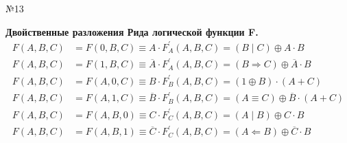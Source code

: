 \documentclass[]{article}
\begin{document}
	\begin{center}\begin{large}{№13}\end{large}\end{center}
	\textbf{Двойственные разложения Рида логической функции F.}
	\[
	\begin{aligned}
	F(A, B, C) &= F(0, B, C)\equiv A \cdot F^{'}_A(A,B,C)=(B\mid C)\oplus A \cdot B\\
	F(A, B, C) &= F(1, B, C)\equiv \overline{A} \cdot F^{'}_A(A,B,C)=(B\Rightarrow C)\oplus \overline{A}\cdot B\\
	F(A, B, C) &= F(A, 0, C)\equiv B\cdot F^{'}_B(A,B,C)=(1\oplus B)\cdot(A+C)\\
	F(A, B, C) &= F(A, 1, C)\equiv \overline{B} \cdot F^{'}_B(A,B,C)=(A\equiv C)\oplus\overline{B}\cdot(A+C)\\
	F(A, B, C) &= F(A, B, 0)\equiv C \cdot F^{'}_C(A,B,C)=(A\mid B)\oplus C \cdot B\\
	F(A, B, C) &= F(A, B, 1)\equiv \overline{C} \cdot F^{'}_C(A,B,C)=(A\Leftarrow B)\oplus\overline{C}\cdot B\\
	\end{aligned}
	\]
\end{document}
